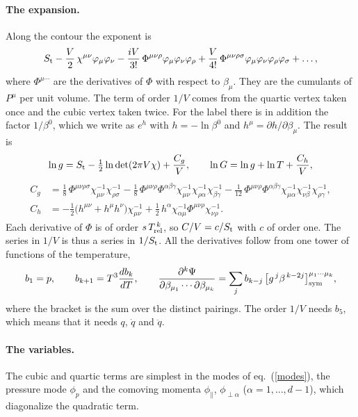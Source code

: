 \documentclass[11pt,aps,preprint,nofootinbib,superscriptaddress,tightenlines]{revtex4-2}
\def\st{\begin{equation}}
\def\stp{\end{equation}}
\def\Eq#1{eq.~(\ref{#1})}
\let\oldparagraph\paragraph
\renewcommand{\paragraph}{\par\bigskip\oldparagraph}
\begin{document}
\paragraph{The expansion.}  Along the contour the exponent is
\st
S_{\rm t}-\frac V2\,\chi^{\mu\nu}\varphi_\mu\varphi_\nu-\frac{iV}{3!}\,\Phi^{\mu\nu\rho}\varphi_\mu\varphi_\nu\varphi_\rho+\frac V{4!}\,\Phi^{\mu\nu\rho\sigma}\varphi_\mu\varphi_\nu\varphi_\rho\varphi_\sigma+\dots,
\stp
where $\Phi^{\mu\cdots}$ are the derivatives of $\Phi$ with respect to $\beta_\mu$.  They are the cumulants of $P^\mu$ per unit volume.  The term of
order $1/V$ comes from the quartic vertex taken once and the cubic vertex taken twice.  For the label there is in addition the factor $1/\beta^0$,
which we write as $e^{h}$ with $h=-\ln\beta^0$ and $h^\mu=\partial h/\partial\beta_\mu$.  The result is
\st
\ln g=S_{\rm t}-\tfrac12\ln\det(2\pi V\chi)+\frac{C_g}V,\qquad \ln G=\ln g+\ln T+\frac{C_h}V ,
\stp
\begin{align}
C_g&=\tfrac18\,\Phi^{\mu\nu\rho\sigma}\chi^{-1}_{\mu\nu}\chi^{-1}_{\rho\sigma}
-\tfrac18\,\Phi^{\mu\nu\rho}\Phi^{\alpha\beta\gamma}\chi^{-1}_{\mu\nu}\chi^{-1}_{\rho\alpha}\chi^{-1}_{\beta\gamma}
-\tfrac1{12}\,\Phi^{\mu\nu\rho}\Phi^{\alpha\beta\gamma}\chi^{-1}_{\mu\alpha}\chi^{-1}_{\nu\beta}\chi^{-1}_{\rho\gamma}, \nonumber\\
C_h&=-\tfrac12\big(h^{\mu\nu}+h^\mu h^\nu\big)\chi^{-1}_{\mu\nu}+\tfrac12\,h^\alpha\chi^{-1}_{\alpha\mu}\Phi^{\mu\nu\rho}\chi^{-1}_{\nu\rho} .
\label{CgCh}
\end{align}
Each derivative of $\Phi$ is of order $s\,T_{\rm rel}^{\,k}$, so $C/V=c/S_{\rm t}$ with $c$ of order one.  The series in $1/V$ is thus a series in
$1/S_{\rm t}$.  All the derivatives follow from one tower of functions of the temperature,
\st
b_1=p,\qquad b_{k+1}=T^3\frac{db_k}{dT},\qquad \frac{\partial^k\Psi}{\partial\beta_{\mu_1}\cdots\partial\beta_{\mu_k}}=\sum_jb_{k-j}\,\big[g^{\,j}\beta^{\,k-2j}\big]^{\mu_1\cdots\mu_k}_{\rm sym} ,
\stp
where the bracket is the sum over the distinct pairings.  The order $1/V$ needs $b_5$,
which means that it needs $q$, $\dot q$ and $\ddot q$.

\paragraph{The variables.}  The cubic and quartic terms are simplest in the modes of \Eq{modes}, the pressure mode $\phi_p$ and the comoving momenta
$\phi_\parallel$, $\phi_{\perp\alpha}$ ($\alpha=1,\dots,d-1$), which diagonalize the quadratic term.
\end{document}

